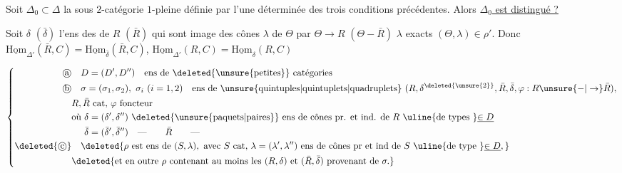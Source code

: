 Soit $\Delta_0\subset\Delta$ la sous $2$-catégorie $1$-pleine définie par l'une déterminée des trois conditions précédentes. Alors \uline{$\Delta_0$ est distingué ?}

Soit \deleted{\unsure{$\varphi$|$\Delta$}} $\delta$ $(\bar\delta)$ l'ens des  de $R$ $(\bar R)$ qui sont image des  cônes $\lambda$  de $\Theta$ par $\Theta\to R$ $(\Theta-\bar R)$ $\lambda$ exacts  $(\Theta,\lambda)\in\rho'$. Donc $\underline{\mathrm{Hom}}_{\Delta'}(\bar R,C)=\underline{\mathrm{Hom}}_{\bar\delta}(\bar R,C)$, $\underline{\mathrm{Hom}}_{\Delta'}(R,C)=\underline{\mathrm{Hom}}_\delta(R,C)$


\[
\left\{\begin{aligned}
\text{\textcircled{a}}&\quad D=(D',D'')\quad\text{ens de }\deleted{\unsure{\text{petites}}}\text{ catégories}\\
\text{\textcircled{b}}&\quad \sigma=(\sigma_1,\sigma_2),\ \sigma_i\ (i=1,2)\quad\text{ens de }\unsure{\text{quintuples}|\text{quintuplets}|\text{quadruplets}}\ (R,\delta^{\deleted{\unsure{2}}},\bar R,\bar\delta,\varphi:R\unsure{-|\to}\bar R),\\
& R,\bar R\text{ cat, }\varphi\text{ foncteur}\\
&\text{où }\delta=(\delta',\delta'')\ \deleted{\unsure{\text{paquets}|\text{paires}}}\text{ ens de cônes pr. et ind. de } R\text{ \uline{de types }}\underline{\in D}\\
&\phantom{\text{où }}\bar\delta=(\bar\delta',\bar\delta'')\quad\text{---}\qquad \bar R\qquad\text{---}\\
\deleted{\text{\textcircled{c}}}&\quad\deleted{\rho\text{ est ens de }(S,\lambda),\text{ avec }S\text{ cat, }\lambda=(\lambda',\lambda'')\text{ ens de cônes pr et ind de }S\text{ \uline{de type }}\underline{\in D},}\\
&\deleted{\text{et en outre }\rho\text{ contenant au moins les }(R,\delta)\text{ et }(\bar R,\bar\delta)\text{ provenant de }\sigma.}
\end{aligned}\right.
\]



